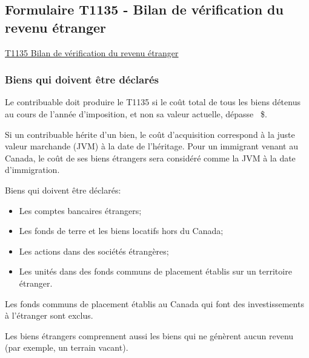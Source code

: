 \subsection{Formulaire T1135 - Bilan de vérification du revenu étranger}
\cat\href{https://www.canada.ca/fr/agence-revenu/services/formulaires-publications/formulaires/t1135.html}{T1135 Bilan de vérification du revenu étranger}

\subsubsection{Biens qui doivent être déclarés}
Le contribuable doit produire le T1135 si le coût total de tous les biens détenus au cours de l'année d'imposition, et non sa valeur actuelle, dépasse ~\$.

Si un contribuable hérite d'un bien, le coût d'acquisition correspond à la juste valeur marchande (JVM) à la date de l'héritage. Pour un immigrant venant au Canada, le coût de ses biens étrangers sera considéré comme la JVM à la date d'immigration.

Biens qui doivent être déclarés:
\begin{itemize}
	\item Les comptes bancaires étrangers;
	\item Les fonds de terre et les biens locatifs hors du Canada;
	\item Les actions dans des sociétés étrangères;
	\item Les unités dans des fonds communs de placement établis sur un territoire étranger.
\end{itemize}

Les fonds communs de placement établis au Canada qui font des investissements à l'étranger sont exclus.

\begin{note}
	Les biens étrangers comprennent aussi les biens qui ne génèrent aucun revenu (par exemple, un terrain vacant).
\end{note}

